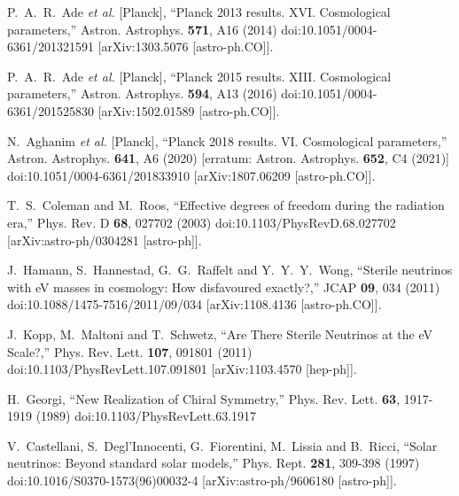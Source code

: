 \begin{thebibliography}{99}
P.~A.~R.~Ade \textit{et al.} [Planck],
``Planck 2013 results. XVI. Cosmological parameters,''
Astron. Astrophys. \textbf{571}, A16 (2014)
doi:10.1051/0004-6361/201321591
[arXiv:1303.5076 [astro-ph.CO]].

P.~A.~R.~Ade \textit{et al.} [Planck],
``Planck 2015 results. XIII. Cosmological parameters,''
Astron. Astrophys. \textbf{594}, A13 (2016)
doi:10.1051/0004-6361/201525830
[arXiv:1502.01589 [astro-ph.CO]].

N.~Aghanim \textit{et al.} [Planck],
``Planck 2018 results. VI. Cosmological parameters,''
Astron. Astrophys. \textbf{641}, A6 (2020)
[erratum: Astron. Astrophys. \textbf{652}, C4 (2021)]
doi:10.1051/0004-6361/201833910
[arXiv:1807.06209 [astro-ph.CO]].

T.~S.~Coleman and M.~Roos,
``Effective degrees of freedom during the radiation era,''
Phys. Rev. D \textbf{68}, 027702 (2003)
doi:10.1103/PhysRevD.68.027702
[arXiv:astro-ph/0304281 [astro-ph]].

J.~Hamann, S.~Hannestad, G.~G.~Raffelt and Y.~Y.~Y.~Wong,
``Sterile neutrinos with eV masses in cosmology: How disfavoured exactly?,''
JCAP \textbf{09}, 034 (2011)
doi:10.1088/1475-7516/2011/09/034
[arXiv:1108.4136 [astro-ph.CO]].

J.~Kopp, M.~Maltoni and T.~Schwetz,
``Are There Sterile Neutrinos at the eV Scale?,''
Phys. Rev. Lett. \textbf{107}, 091801 (2011)
doi:10.1103/PhysRevLett.107.091801
[arXiv:1103.4570 [hep-ph]].

H.~Georgi,
``New Realization of Chiral Symmetry,''
Phys. Rev. Lett. \textbf{63}, 1917-1919 (1989)
doi:10.1103/PhysRevLett.63.1917

V.~Castellani, S.~Degl'Innocenti, G.~Fiorentini, M.~Lissia and B.~Ricci,
``Solar neutrinos: Beyond standard solar models,''
Phys. Rept. \textbf{281}, 309-398 (1997)
doi:10.1016/S0370-1573(96)00032-4
[arXiv:astro-ph/9606180 [astro-ph]].


\end{thebibliography}
